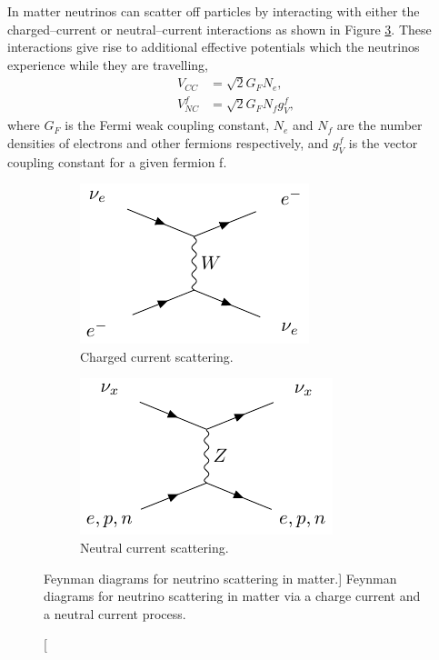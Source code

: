 In matter neutrinos can scatter off particles by interacting with either
the charged--current or neutral--current interactions as shown in Figure
\ref{fig:nu_in_matter}. These interactions give rise to additional effective
potentials which the neutrinos experience while they are travelling,
\begin{align}
	V_{CC} &= \sqrt{2} G_F N_e, \\
	V_{NC}^f &= \sqrt{2} G_F N_f g_V^f,
\end{align}
where $G_F$ is the Fermi weak coupling constant, $N_e$ and $N_f$ are the number
densities of electrons and other fermions respectively, and $g_V^f$ is the
vector coupling constant for a given fermion f.
\begin{figure}
	\centering

	\begin{subfigure}[b]{0.49\textwidth}
		\includegraphics[width=\textwidth]{latex_extras/ne_cc.pdf}
		\caption{Charged current scattering.}
		\label{fig:nu_cc}
	\end{subfigure}
	\hfill
	\begin{subfigure}[b]{0.49\textwidth}
		\includegraphics[width=\textwidth]{latex_extras/n_nc.pdf}
		\caption{Neutral current scattering.}
		\label{fig:nu_nc}
	\end{subfigure}

	\caption
	[Feynman diagrams for neutrino scattering in matter.]
	{Feynman diagrams for neutrino scattering in matter via a charge current and a
	neutral current process.}

	\label{fig:nu_in_matter}
\end{figure}

